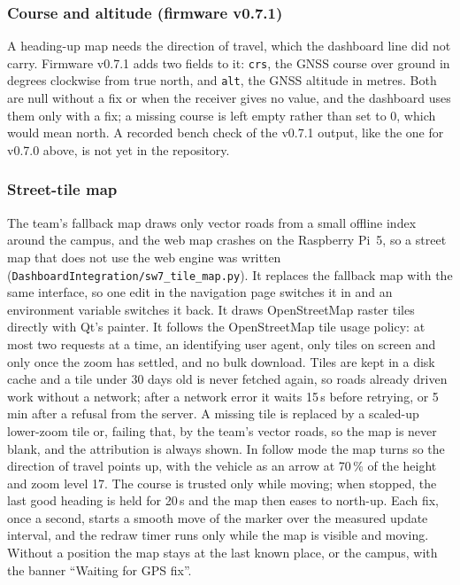 \subsubsection*{Course and altitude (firmware v0.7.1)}
\label{sec:fw071}
A heading-up map needs the direction of travel, which the dashboard line did not carry. Firmware v0.7.1 adds two fields to it: \texttt{crs}, the GNSS course over ground in degrees clockwise from true north, and \texttt{alt}, the GNSS altitude in metres. Both are null without a fix or when the receiver gives no value, and the dashboard uses them only with a fix; a missing course is left empty rather than set to 0, which would mean north. A recorded bench check of the v0.7.1 output, like the one for v0.7.0 above, is not yet in the repository.

\subsubsection*{Street-tile map}
\label{sec:tile-map}
The team's fallback map draws only vector roads from a small offline index around the campus, and the web map crashes on the Raspberry Pi~5, so a street map that does not use the web engine was written (\texttt{DashboardIntegration/sw7\_tile\_map.py}). It replaces the fallback map with the same interface, so one edit in the navigation page switches it in and an environment variable switches it back. It draws OpenStreetMap raster tiles directly with Qt's painter. It follows the OpenStreetMap tile usage policy: at most two requests at a time, an identifying user agent, only tiles on screen and only once the zoom has settled, and no bulk download. Tiles are kept in a disk cache and a tile under 30 days old is never fetched again, so roads already driven work without a network; after a network error it waits 15\,s before retrying, or 5\,min after a refusal from the server. A missing tile is replaced by a scaled-up lower-zoom tile or, failing that, by the team's vector roads, so the map is never blank, and the attribution is always shown. In follow mode the map turns so the direction of travel points up, with the vehicle as an arrow at 70\,\% of the height and zoom level 17. The course is trusted only while moving; when stopped, the last good heading is held for 20\,s and the map then eases to north-up. Each fix, once a second, starts a smooth move of the marker over the measured update interval, and the redraw timer runs only while the map is visible and moving. Without a position the map stays at the last known place, or the campus, with the banner ``Waiting for GPS fix''.

